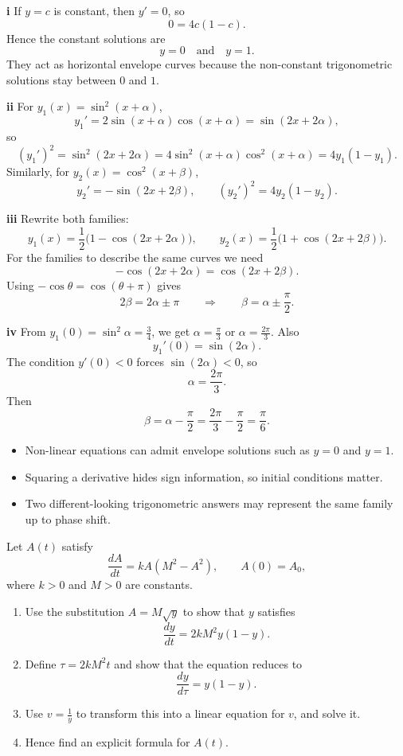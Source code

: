 \begin{solution}
\textbf{i} If $y=c$ is constant, then $y'=0$, so
\[
0=4c(1-c).
\]
Hence the constant solutions are
\[
\boxed{y=0 \quad \text{and} \quad y=1.}
\]
They act as horizontal envelope curves because the non-constant trigonometric solutions stay between $0$ and $1$.

\textbf{ii} For $y_1(x)=\sin^2(x+\alpha)$,
\[
y_1'=2\sin(x+\alpha)\cos(x+\alpha)=\sin(2x+2\alpha),
\]
so
\[
(y_1')^2=\sin^2(2x+2\alpha)=4\sin^2(x+\alpha)\cos^2(x+\alpha)=4y_1(1-y_1).
\]
Similarly, for $y_2(x)=\cos^2(x+\beta)$,
\[
y_2'=-\sin(2x+2\beta), \qquad (y_2')^2=4y_2(1-y_2).
\]

\textbf{iii} Rewrite both families:
\[
y_1(x)=\frac12\bigl(1-\cos(2x+2\alpha)\bigr), \qquad
y_2(x)=\frac12\bigl(1+\cos(2x+2\beta)\bigr).
\]
For the families to describe the same curves we need
\[
-\cos(2x+2\alpha)=\cos(2x+2\beta).
\]
Using $-\cos\theta=\cos(\theta+\pi)$ gives
\[
2\beta=2\alpha\pm\pi
\qquad \Longrightarrow \qquad
\boxed{\beta=\alpha\pm\frac{\pi}{2}.}
\]

\textbf{iv} From $y_1(0)=\sin^2\alpha=\frac34$, we get $\alpha=\frac{\pi}{3}$ or $\alpha=\frac{2\pi}{3}$. Also
\[
y_1'(0)=\sin(2\alpha).
\]
The condition $y'(0)<0$ forces $\sin(2\alpha)<0$, so
\[
\boxed{\alpha=\frac{2\pi}{3}.}
\]
Then
\[
\beta=\alpha-\frac{\pi}{2}=\frac{2\pi}{3}-\frac{\pi}{2}=\boxed{\frac{\pi}{6}}.
\]
\end{solution}

\begin{takeaways}
\begin{itemize}[leftmargin=*]
    \item Non-linear equations can admit envelope solutions such as $y=0$ and $y=1$.
    \item Squaring a derivative hides sign information, so initial conditions matter.
    \item Two different-looking trigonometric answers may represent the same family up to phase shift.
\end{itemize}
\end{takeaways}

\begin{problem}
Let $A(t)$ satisfy
\[
\frac{dA}{dt}=kA(M^2-A^2), \qquad A(0)=A_0,
\]
where $k>0$ and $M>0$ are constants.

\begin{enumerate}
    \item[\textbf{i}] Use the substitution $A=M\sqrt{y}$ to show that $y$ satisfies
    \[
    \frac{dy}{dt}=2kM^2y(1-y).
    \]
    \item[\textbf{ii}] Define $\tau=2kM^2t$ and show that the equation reduces to
    \[
    \frac{dy}{d\tau}=y(1-y).
    \]
    \item[\textbf{iii}] Use $v=\frac1y$ to transform this into a linear equation for $v$, and solve it.
    \item[\textbf{iv}] Hence find an explicit formula for $A(t)$.
\end{enumerate}
\end{problem}

